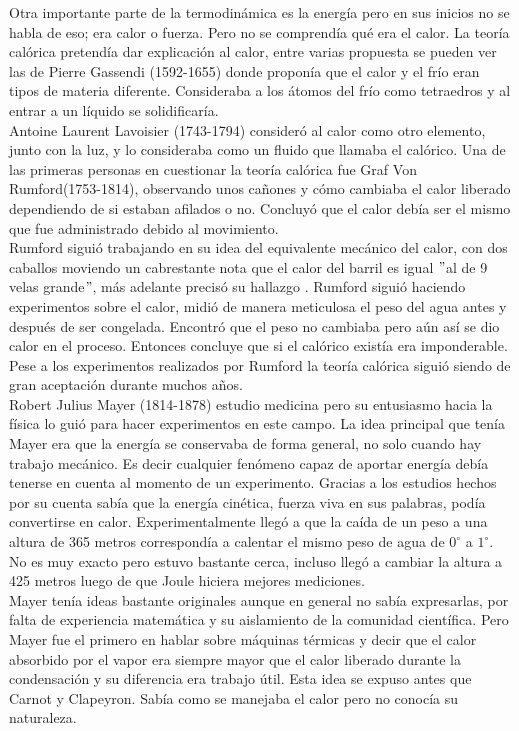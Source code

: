 Otra importante parte de la termodinámica es la energía pero en sus inicios no se habla de eso; era calor o fuerza. Pero no se comprendía qué era el calor. La teoría calórica pretendía dar explicación al calor, entre varias propuesta se pueden ver las de Pierre Gassendi (1592-1655) donde proponía que el calor y el frío eran tipos de materia diferente. Consideraba a los átomos del frío como tetraedros y al entrar a un líquido se solidificaría.
\\
Antoine Laurent Lavoisier (1743-1794) consideró al calor como otro elemento, junto con la luz, y lo consideraba como un fluido que llamaba el calórico. Una de las primeras personas en cuestionar la teoría calórica fue Graf Von Rumford(1753-1814), observando unos cañones y cómo cambiaba el calor liberado dependiendo de si estaban afilados  o no. Concluyó que el calor debía ser el mismo que fue administrado debido al movimiento.
\\
Rumford siguió trabajando en su idea del equivalente mecánico del calor, con dos caballos moviendo un cabrestante nota que el calor del barril es igual $"$al de 9 velas grande$"$, más adelante precisó su hallazgo \cite{MullerHistory}. Rumford siguió haciendo experimentos sobre el calor, midió de manera meticulosa el peso del agua antes y después de ser congelada. Encontró que el peso no cambiaba pero aún así se dio calor en el proceso. Entonces concluye que si el calórico existía era imponderable. Pese a los experimentos realizados por Rumford la teoría calórica siguió siendo de gran aceptación durante muchos años.	
\\
Robert Julius Mayer (1814-1878) estudio medicina pero su entusiasmo hacia la física lo guió para hacer experimentos en este campo. La idea principal que tenía Mayer era que la energía se conservaba de forma general, no solo cuando hay trabajo mecánico. Es decir cualquier fenómeno capaz de aportar energía debía tenerse en cuenta al momento de un experimento. Gracias a los estudios hechos por su cuenta sabía que la energía cinética, fuerza viva en sus  palabras, podía convertirse en calor. Experimentalmente llegó a que la caída de un peso a una altura  de 365 metros correspondía a calentar el mismo peso de agua de $0^{\circ}$ a $1^{\circ}$. No es muy exacto pero estuvo bastante cerca, incluso llegó a cambiar la altura a 425 metros luego de que Joule hiciera mejores mediciones.
\\
Mayer tenía ideas bastante originales aunque en general no sabía expresarlas, por falta de experiencia matemática y su aislamiento de la comunidad científica. Pero Mayer fue el primero en hablar sobre máquinas térmicas y decir que el calor absorbido por el vapor era siempre mayor que el calor liberado durante la condensación y su diferencia era trabajo útil. Esta idea se expuso antes que Carnot y Clapeyron. Sabía como se manejaba el calor pero no conocía su naturaleza.
